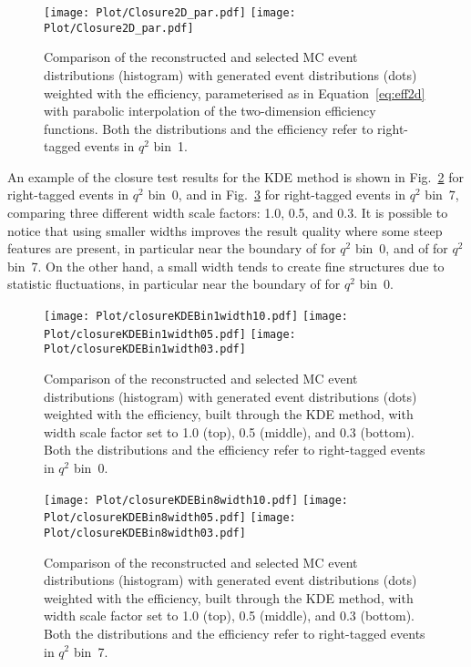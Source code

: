 \begin{figure}[hbt]
    \texttt{[image: Plot/Closure2D\_par.pdf]}
    \texttt{[image: Plot/Closure2D\_par.pdf]}
    \caption{Comparison of the reconstructed and selected MC event distributions (histogram) with generated event distributions (dots) weighted with the efficiency, parameterised as in Equation~\ref{eq:eff2d} with parabolic interpolation of the two-dimension efficiency functions. Both the distributions and the efficiency refer to right-tagged events in $q^2$ bin~1.}
    \label{fig:clEff2Dpar}
\end{figure}

An example of the closure test results for the KDE method is shown in Fig.~\ref{fig:clKDEwidthBin1} for right-tagged events in $q^2$ bin~0, and in Fig.~\ref{fig:clKDEwidthBin8} for right-tagged events in $q^2$ bin~7, comparing three different width scale factors: 1.0, 0.5, and 0.3.
It is possible to notice that using smaller widths improves the result quality where some steep features are present, in particular near the boundary of \cTK for $q^2$ bin~0, and of \PHI for $q^2$ bin~7.
On the other hand, a small width tends to create fine structures due to statistic fluctuations, in particular near the boundary of \PHI for $q^2$ bin~0.

\begin{figure}[hbt]
    \texttt{[image: Plot/closureKDEBin1width10.pdf]}
    \texttt{[image: Plot/closureKDEBin1width05.pdf]}
    \texttt{[image: Plot/closureKDEBin1width03.pdf]}
    \caption{Comparison of the reconstructed and selected MC event distributions (histogram) with generated event distributions (dots) weighted with the efficiency, built through the KDE method, with width scale factor set to 1.0 (top), 0.5 (middle), and 0.3 (bottom). Both the distributions and the efficiency refer to right-tagged events in $q^2$ bin~0.}
    \label{fig:clKDEwidthBin1}
\end{figure}

\begin{figure}[hbt]
    \texttt{[image: Plot/closureKDEBin8width10.pdf]}
    \texttt{[image: Plot/closureKDEBin8width05.pdf]}
    \texttt{[image: Plot/closureKDEBin8width03.pdf]}
    \caption{Comparison of the reconstructed and selected MC event distributions (histogram) with generated event distributions (dots) weighted with the efficiency, built through the KDE method, with width scale factor set to 1.0 (top), 0.5 (middle), and 0.3 (bottom). Both the distributions and the efficiency refer to right-tagged events in $q^2$ bin~7.}
    \label{fig:clKDEwidthBin8}
\end{figure}

